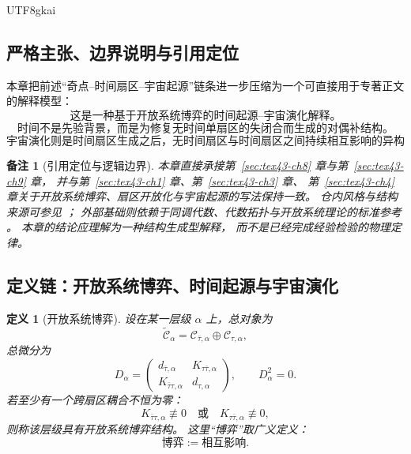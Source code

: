 \documentclass[12pt]{article}
\newtheorem{definition}{定义}[section]
\newtheorem{remark}{备注}[section]
\begin{document}
\begin{CJK*}{UTF8}{gkai}
\subsection{严格主张、边界说明与引用定位}
\label{subsec:tex43-ch10-convention}

本章把前述“奇点--时间扇区--宇宙起源”链条进一步压缩为一个可直接用于专著正文的解释模型：
\[
  \boxed{
    \text{这是一种基于开放系统博弈的时间起源--宇宙演化解释。}
  }
\]
\[
  \boxed{
    \text{时间不是先验背景，而是为修复无时间单扇区的失闭合而生成的对偶补结构。}
  }
\]
\[
  \boxed{
    \text{宇宙演化则是时间扇区生成之后，无时间扇区与时间扇区之间持续相互影响的异构演化过程。}
  }
\]

\begin{remark}[引用定位与逻辑边界]
本章直接承接第~\ref{sec:tex43-ch8} 章与第~\ref{sec:tex43-ch9} 章，
并与第~\ref{sec:tex43-ch1} 章、第~\ref{sec:tex43-ch3} 章、
第~\ref{sec:tex43-ch4} 章关于开放系统博弈、扇区开放化与宇宙起源的写法保持一致。
仓内风格与结构来源可参见
\cite{RepoTex23OpenSystemGame,RepoTex37SemanticGaugeRuntime,RepoTex38JacobiBianchiRepair,RepoTex39StatRepair,
  GaoZheng2025GFramework}；
外部基础则依赖于同调代数、代数拓扑与开放系统理论的标准参考
\cite{Weibel1994HomologicalAlgebra,Hatcher2002AT,BreuerPetruccione2002OpenQuantumSystems}。
本章的结论应理解为一种\emph{结构生成型解释}，
而不是已经完成经验检验的物理定律。
\end{remark}

\subsection{定义链：开放系统博弈、时间起源与宇宙演化}
\label{subsec:tex43-ch10-definitions}

\begin{definition}[开放系统博弈]
\label{def:tex43-open-game-time-origin}
设在某一层级 $\alpha$ 上，总对象为
\[
  \widetilde{\mathcal C}_\alpha
  =
  \mathcal C_{\bar\tau,\alpha}\oplus \mathcal C_{\tau,\alpha},
\]
总微分为
\[
  D_\alpha
  =
  \begin{pmatrix}
    d_{\bar\tau,\alpha} & K_{\tau\bar\tau,\alpha}\\
    K_{\bar\tau\tau,\alpha} & d_{\tau,\alpha}
  \end{pmatrix},
  \qquad
  D_\alpha^2=0.
\]
若至少有一个跨扇区耦合不恒为零：
\[
  K_{\bar\tau\tau,\alpha}\not\equiv 0
  \quad\text{或}\quad
  K_{\tau\bar\tau,\alpha}\not\equiv 0,
\]
则称该层级具有\emph{开放系统博弈结构}。
这里“博弈”取广义定义：
\[
  \text{博弈} := \text{相互影响}.
\]
\end{definition}


\end{CJK*}
\end{document}
